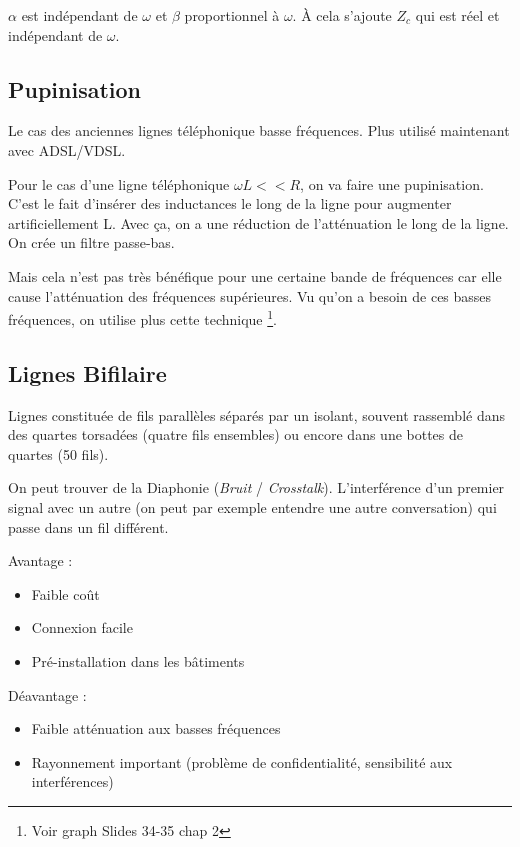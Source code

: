 			$\alpha$ est indépendant de $\omega$ et $\beta$ proportionnel à $\omega$. À cela s'ajoute $Z_c$ qui est réel et indépendant de $\omega$.
			
						
	\subsection{Pupinisation}
	
		Le cas des anciennes lignes téléphonique basse fréquences. Plus utilisé maintenant avec ADSL/VDSL.
		
		Pour le cas d'une ligne téléphonique $\omega L << R$, on va faire une pupinisation. C'est le fait d'insérer des inductances le long de la ligne pour augmenter artificiellement L. Avec ça, on a une réduction de l'atténuation le long de la ligne. On crée un filtre passe-bas.
		
		Mais cela n'est pas très bénéfique pour une certaine bande de fréquences car elle cause l'atténuation des fréquences supérieures. Vu qu'on a besoin de ces basses fréquences, on utilise plus cette technique \footnote{Voir graph Slides 34-35 chap 2}.
		
	\subsection{Lignes Bifilaire}
	
		Lignes constituée de fils parallèles séparés par un isolant, souvent rassemblé dans des quartes torsadées (quatre fils ensembles) ou encore dans une bottes de quartes (50 fils).
		
		On peut trouver de la Diaphonie (\textit{Bruit} / \textit{Crosstalk}). L'interférence d'un premier signal avec un autre (on peut par exemple entendre une autre conversation) qui passe dans un fil différent.
		
		Avantage :
		\begin{itemize}
			\item Faible coût
			\item Connexion facile
			\item Pré-installation dans les bâtiments
		\end{itemize}
		
		Déavantage :
		\begin{itemize}
			\item Faible atténuation aux basses fréquences
			\item Rayonnement important (problème de confidentialité, sensibilité aux interférences)
		\end{itemize}

